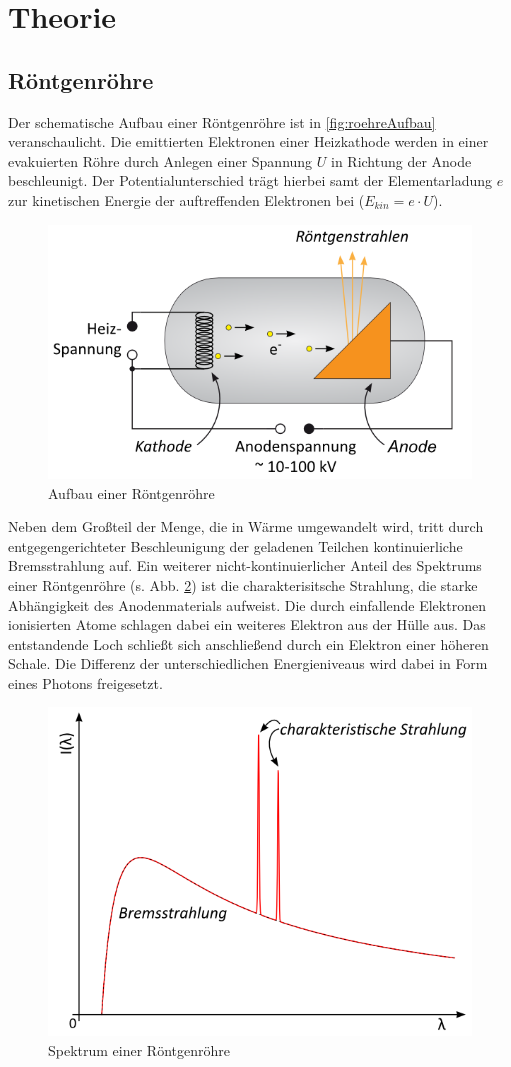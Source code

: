 \section{Theorie}
\label{sec:Theorie}

\subsection{Röntgenröhre}

Der schematische Aufbau einer Röntgenröhre ist in \autoref{fig:roehreAufbau} veranschaulicht.
Die emittierten Elektronen einer Heizkathode werden in einer evakuierten Röhre durch Anlegen einer Spannung $U$ in Richtung der Anode beschleunigt.
Der Potentialunterschied trägt hierbei samt der Elementarladung $e$ zur kinetischen Energie der auftreffenden Elektronen bei ($E_{kin} = e \cdot U$).
\begin{figure}
    \centering
    \includegraphics[width=0.5\linewidth]{abb/6621.png}
    \caption{Aufbau einer Röntgenröhre \cite{roehre}}
    \label{fig:roehreAufbau}
\end{figure}
Neben dem Großteil der Menge, die in Wärme umgewandelt wird, tritt durch entgegengerichteter Beschleunigung der geladenen Teilchen kontinuierliche Bremsstrahlung auf.
Ein weiterer nicht-kontinuierlicher Anteil des Spektrums einer Röntgenröhre (s. Abb. \ref{fig:roehreSpektrum}) ist die charakterisitsche Strahlung,
die starke Abhängigkeit des Anodenmaterials aufweist. Die durch einfallende Elektronen ionisierten Atome schlagen dabei ein weiteres Elektron aus der Hülle aus.
Das entstandende Loch schließt sich anschließend durch ein Elektron einer höheren Schale. Die Differenz der unterschiedlichen Energieniveaus wird dabei in Form eines Photons freigesetzt.
\begin{figure}
    \centering
    \includegraphics[width=0.5\linewidth]{abb/6635.png}
    \caption{Spektrum einer Röntgenröhre \cite{roehre}}
    \label{fig:roehreSpektrum}
\end{figure}

